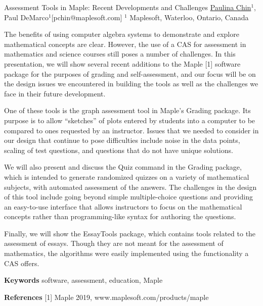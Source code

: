 
\begin{abstract_online}{Assessment Tools in Maple: Recent Developments and Challenges}{%
        \underline{Paulina Chin}$^{1}$, Paul DeMarco$^{1}$}{[pchin@maplesoft.com]
        }{%
        $^1$ Maplesoft, Waterloo, Ontario, Canada}

The benefits of using computer algebra systems to  demonstrate and explore mathematical concepts are clear. However, the use of a CAS for assessment in mathematics and science courses still poses a number of challenges.  In this presentation, we will show several recent additions to the Maple [1] software package for the purposes of grading and self-assessment, and our focus will be on the design issues we encountered in building the tools as well as the challenges we face in their future development.  

One of these tools is the graph assessment tool in Maple’s Grading package. Its purpose is to allow “sketches” of plots entered by students into a computer to be compared to ones requested by an instructor. Issues that we needed to consider in our design that continue to pose difficulties include noise in the data points, scaling of test questions, and questions that do not have unique solutions. 

We will also present and discuss the Quiz command in the Grading package, which is intended to generate randomized quizzes on a variety of mathematical subjects, with automated assessment of the answers. The challenges in the design of this tool include going beyond simple multiple-choice questions and providing an easy-to-use interface that allows instructors to focus on the mathematical concepts rather than programming-like syntax for authoring the questions.

Finally, we will show the EssayTools package, which contains tools related to the assessment of essays. Though they are not meant for the assessment of mathematics, the algorithms were easily implemented using the functionality a CAS offers.
     

\textbf{Keywords} \newline{} software, assessment, education, Maple

\textbf{References} \newline{}
[1] Maple 2019, www.maplesoft.com/products/maple \newline{}
\end{abstract_online}
    